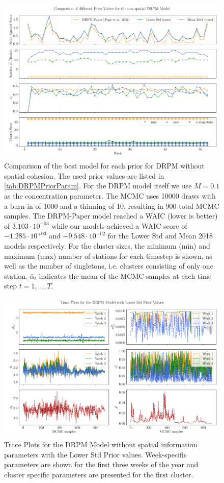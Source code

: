 \documentclass[12pt,a4paper]{article}
\begin{document}
\begin{figure}
    \centering
    \includegraphics[width=.95\linewidth]{./imgs/drpm/drpm_base_models_comparison.pdf}
    \caption{Comparison of the best model for each prior for DRPM without spatial cohesion.
    The used prior values are listed in \cref{tab:DRPMPriorParam}. For the DRPM model itself we use
    $M=0.1$ as the concentration parameter. The MCMC uses 10000 draws with a burn-in of 1000 and a
    thinning of 10, resulting in 900 total MCMC samples. The DRPM-Paper model reached a WAIC (lower is better) of
    $3.103 \cdot 10^{+03}$ while our models achieved a WAIC score of $-1.285 \cdot 10^{+03}$ and
    $-9.548 \cdot 10^{+02}$ for the Lower Std and Mean 2018 models respectively. For the cluster sizes,
    the minimum (min) and maximum (max) number of stations for each timestep is shown, as well as the number of
    singletons, i.e. clusters consisting of only one station. $\bar{\alpha}_t$ indicates the mean of the MCMC
    samples at each time step $t=1, \ldots, T$.}
    \label{fig:drpm_base_models_comparison}
\end{figure}

\begin{figure}
    \centering
    \includegraphics[width=.99\linewidth]{./imgs/drpm/drpm_lower_std_trace_plots.pdf}
    \caption{Trace Plots for the DRPM Model without spatial information parameters with the Lower Std Prior values. 
    Week-specific
    parameters are shown for the first three weeks of the year and cluster specific parameters are
    presented for the first cluster.}
    \label{fig:drpm_lower_std_trace_plots}
\end{figure}
\end{document}
